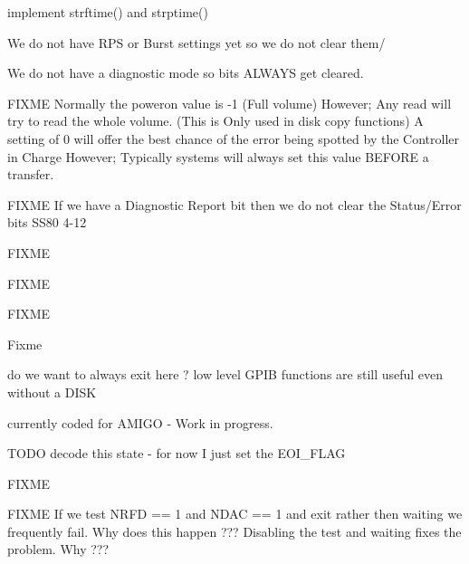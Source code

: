 
\begin{DoxyRefList}
\item[\label{todo__todo000001}%
\hypertarget{todo__todo000001}{}%
Global \hyperlink{time_8h_a7ffc52def0c7fbf70c50248e3f7d6a8a}{asctime\+\_\+r} (tm\+\_\+t $\ast$t, char $\ast$buf)]implement strftime() and strptime()  
\item[\label{todo__todo000047}%
\hypertarget{todo__todo000047}{}%
Global \hyperlink{ss80_8h_aa48ccb1479e226dacfaa1dac15631a9d}{Clear\+\_\+\+Common} (int u)]We do not have R\+PS or Burst settings yet so we do not clear them/ 

We do not have a diagnostic mode so bits A\+L\+W\+A\+YS get cleared. 

F\+I\+X\+ME Normally the poweron value is -\/1 (Full volume) However; Any read will try to read the whole volume. (This is Only used in disk copy functions) A setting of 0 will offer the best chance of the error being spotted by the Controller in Charge However; Typically systems will always set this value B\+E\+F\+O\+RE a transfer. 

F\+I\+X\+ME If we have a Diagnostic Report bit then we do not clear the Status/\+Error bits S\+S80 4-\/12  
\item[\label{todo__todo000054}%
\hypertarget{todo__todo000054}{}%
Global \hyperlink{fatfs__utils_8h_a97a2409a53057e1a63537f196ff00a50}{fatfs\+\_\+cat} (char $\ast$name)]F\+I\+X\+ME  
\item[\label{todo__todo000007}%
\hypertarget{todo__todo000007}{}%
Global \hyperlink{gpib__task_8h_ac63d4e431ab55dddfbf436d87135128e}{G\+P\+IB} (uint8\+\_\+t ch)]F\+I\+X\+ME 

F\+I\+X\+ME 

Fixme  
\item[\label{todo__todo000006}%
\hypertarget{todo__todo000006}{}%
Global \hyperlink{gpib__task_8h_a903eb44d83bf8f2db71e6f32a35fec62}{gpib\+\_\+error\+\_\+test} (uint16\+\_\+t val)]do we want to always exit here ? low level G\+P\+IB functions are still useful even without a D\+I\+SK  
\item[\label{todo__todo000002}%
\hypertarget{todo__todo000002}{}%
Global \hyperlink{format_8c_a6897c56caeb4ebc5c5003c1f33a3b14c}{gpib\+\_\+format\+\_\+disk} (char $\ast$name, uint32\+\_\+t size)]currently coded for A\+M\+I\+GO -\/ Work in progress.  
\item[\label{todo__todo000005}%
\hypertarget{todo__todo000005}{}%
Global \hyperlink{gpib_8h_a67f7cdca85091b3eb0eea0051a200fbe}{gpib\+\_\+read\+\_\+str} (uint8\+\_\+t $\ast$buf, int size, uint16\+\_\+t $\ast$status)]T\+O\+DO decode this state -\/ for now I just set the E\+O\+I\+\_\+\+F\+L\+AG  
\item[\label{todo__todo000010}%
\hypertarget{todo__todo000010}{}%
Global \hyperlink{gpib__tests_8h_aed0c6a0a794f33d5cf7691c96d3e4955}{gpib\+\_\+tests} (char $\ast$str)]F\+I\+X\+ME  
\item[\label{todo__todo000003}%
\hypertarget{todo__todo000003}{}%
Global \hyperlink{gpib_8h_ac3d50cc1d56705d107e2f8fb00692e68}{gpib\+\_\+write\+\_\+byte} (uint16\+\_\+t ch)]F\+I\+X\+ME If we test N\+R\+FD == 1 and N\+D\+AC == 1 and exit rather then waiting we frequently fail. Why does this happen ??? Disabling the test and waiting fixes the problem. Why ??? 


\end{DoxyRefList}
